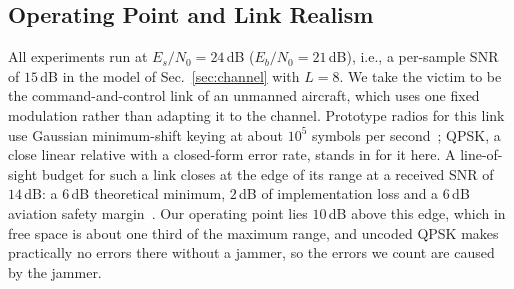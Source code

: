 %
%

\subsection{Operating Point and Link Realism}
\label{sec:setup:env}

All experiments run at $E_s/N_0=24$\,dB ($E_b/N_0=21$\,dB), i.e., a per-sample SNR of $15$\,dB in the model of Sec.~\ref{sec:channel} with $L=8$.
We take the victim to be the command-and-control link of an unmanned aircraft, which uses one fixed modulation rather than adapting it to the channel.
Prototype radios for this link use Gaussian minimum-shift keying at about $10^5$ symbols per second~\cite{bishop2017cnpc}; QPSK, a close linear relative with a closed-form error rate, stands in for it here.
A line-of-sight budget for such a link closes at the edge of its range at a received SNR of $14$\,dB: a $6$\,dB theoretical minimum, $2$\,dB of implementation loss and a $6$\,dB aviation safety margin~\cite{kakar2015uav}.
Our operating point lies $10$\,dB above this edge, which in free space is about one third of the maximum range, and uncoded QPSK makes practically no errors there without a jammer, so the errors we count are caused by the jammer.

